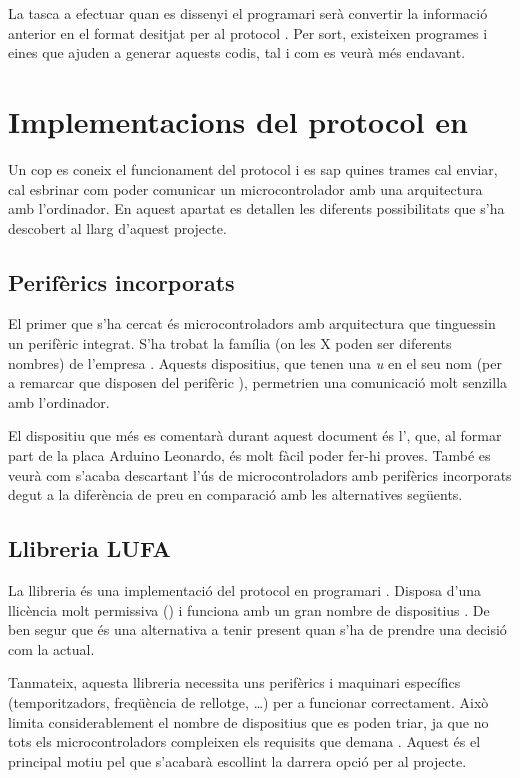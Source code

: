 La tasca a efectuar quan es dissenyi el programari serà convertir la
informació anterior en el format desitjat per al protocol . Per sort,
existeixen programes i eines que ajuden a generar aquests codis, tal i com
es veurà més endavant.

\section{Implementacions del protocol  en }

Un cop es coneix el funcionament del protocol  i es sap quines trames
cal enviar, cal esbrinar com poder comunicar un microcontrolador amb
una arquitectura  amb l'ordinador. En aquest apartat es detallen
les diferents possibilitats que s'ha descobert al llarg d'aquest projecte.

\subsection{Perifèrics incorporats}

El primer que s'ha cercat és microcontroladors amb arquitectura  que
tinguessin un perifèric  integrat. S'ha trobat la família
 (on les X poden ser diferents nombres) de l'empresa
 \cite{AtMega32u4}. Aquests dispositius, que tenen una \emph{u} en
el seu nom (per a remarcar que disposen del perifèric ), permetrien
una comunicació molt senzilla amb l'ordinador.

El dispositiu que més es comentarà durant aquest document és l',
que, al formar part de la placa Arduino Leonardo, és molt fàcil poder fer-hi
proves. També es veurà com s'acaba descartant l'ús de microcontroladors amb
perifèrics incorporats degut a la diferència de preu en comparació amb les
alternatives següents.

\subsection{Llibreria LUFA}

La llibreria  és una implementació del protocol  en
programari \cite{Lufa}. Disposa d'una llicència molt permissiva () i
funciona amb un gran nombre de dispositius . De ben segur que és una
alternativa a tenir present quan s'ha de prendre una decisió com la actual.

Tanmateix, aquesta llibreria necessita uns perifèrics i maquinari específics
(temporitzadors, freqüència de rellotge, \dots) per a funcionar correctament.
Això limita considerablement el nombre de dispositius que es poden triar, ja que
no tots els microcontroladors  compleixen els requisits que
demana . Aquest és el principal motiu pel que s'acabarà escollint la
darrera opció per al projecte.

